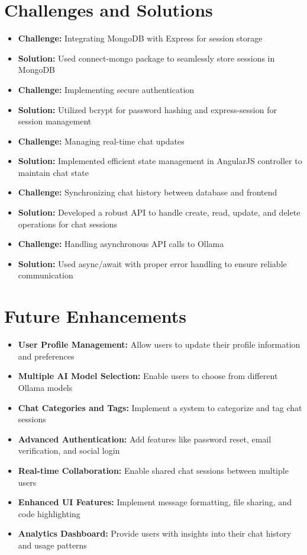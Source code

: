 \documentclass[12pt,a4paper]{article}
\begin{document}
\section{Challenges and Solutions}
\begin{itemize}
\item \textbf{Challenge:} Integrating MongoDB with Express for session storage
\item \textbf{Solution:} Used connect-mongo package to seamlessly store sessions in MongoDB

\item \textbf{Challenge:} Implementing secure authentication
\item \textbf{Solution:} Utilized bcrypt for password hashing and express-session for session management

\item \textbf{Challenge:} Managing real-time chat updates
\item \textbf{Solution:} Implemented efficient state management in AngularJS controller to maintain chat state

\item \textbf{Challenge:} Synchronizing chat history between database and frontend
\item \textbf{Solution:} Developed a robust API to handle create, read, update, and delete operations for chat sessions

\item \textbf{Challenge:} Handling asynchronous API calls to Ollama
\item \textbf{Solution:} Used async/await with proper error handling to ensure reliable communication
\end{itemize}

\section{Future Enhancements}
\begin{itemize}
\item \textbf{User Profile Management:} Allow users to update their profile information and preferences
\item \textbf{Multiple AI Model Selection:} Enable users to choose from different Ollama models
\item \textbf{Chat Categories and Tags:} Implement a system to categorize and tag chat sessions
\item \textbf{Advanced Authentication:} Add features like password reset, email verification, and social login
\item \textbf{Real-time Collaboration:} Enable shared chat sessions between multiple users
\item \textbf{Enhanced UI Features:} Implement message formatting, file sharing, and code highlighting
\item \textbf{Analytics Dashboard:} Provide users with insights into their chat history and usage patterns
\end{itemize}
\end{document}
